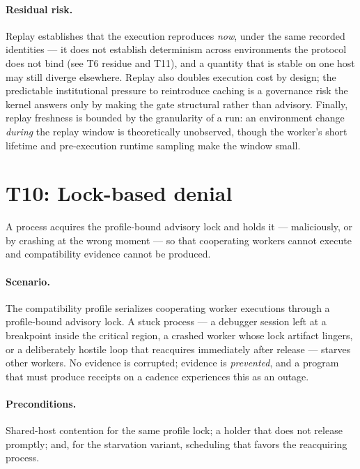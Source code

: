 \paragraph{Residual risk.} Replay establishes that the execution reproduces \emph{now}, under the same recorded identities --- it does not establish determinism across environments the protocol does not bind (see T6 residue and T11), and a quantity that is stable on one host may still diverge elsewhere. Replay also doubles execution cost by design; the predictable institutional pressure to reintroduce caching is a governance risk the kernel answers only by making the gate structural rather than advisory. Finally, replay freshness is bounded by the granularity of a run: an environment change \emph{during} the replay window is theoretically unobserved, though the worker's short lifetime and pre-execution runtime sampling make the window small.

\section{T10: Lock-based denial}\label{threat:t10}

\begin{threat}\label{threat:thr:lock}
A process acquires the profile-bound advisory lock and holds it --- maliciously, or by crashing at the wrong moment --- so that cooperating workers cannot execute and compatibility evidence cannot be produced.
\end{threat}

\paragraph{Scenario.} The compatibility profile serializes cooperating worker executions through a profile-bound advisory lock. A stuck process --- a debugger session left at a breakpoint inside the critical region, a crashed worker whose lock artifact lingers, or a deliberately hostile loop that reacquires immediately after release --- starves other workers. No evidence is corrupted; evidence is \emph{prevented}, and a program that must produce receipts on a cadence experiences this as an outage.

\paragraph{Preconditions.} Shared-host contention for the same profile lock; a holder that does not release promptly; and, for the starvation variant, scheduling that favors the reacquiring process.

